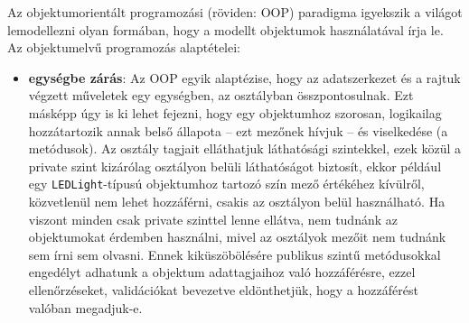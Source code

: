 \documentclass[tocnopagenum]{thesis-ekf}
\begin{document}
	Az objektumorientált programozási (röviden: OOP) paradigma igyekszik a világot lemodellezni olyan formában, hogy a modellt objektumok használatával írja le. 
	Az objektumelvű programozás alaptételei:
	\begin{itemize}
		\item \textbf{egységbe zárás}: Az OOP egyik alaptézise, hogy az adatszerkezet és a rajtuk végzett műveletek egy egységben, az osztályban összpontosulnak. Ezt másképp úgy is ki lehet fejezni, hogy egy objektumhoz szorosan, logikailag hozzátartozik annak belső állapota -- ezt mezőnek hívjuk -- és viselkedése (a metódusok). Az osztály tagjait elláthatjuk láthatósági szintekkel, ezek közül a private szint kizárólag osztályon belüli láthatóságot biztosít, ekkor például egy \verb*|LEDLight|-típusú objektumhoz tartozó szín mező értékéhez kívülről, közvetlenül nem lehet hozzáférni, csakis az osztályon belül használható. Ha viszont minden csak private szinttel lenne ellátva, nem tudnánk az objektumokat érdemben használni, mivel az osztályok mezőit nem tudnánk sem írni sem olvasni. Ennek kiküszöbölésére publikus szintű metódusokkal engedélyt adhatunk a objektum adattagjaihoz való hozzáférésre, ezzel ellenőrzéseket, validációkat bevezetve eldönthetjük, hogy a hozzáférést valóban megadjuk-e.


\end{itemize}
\end{document}

